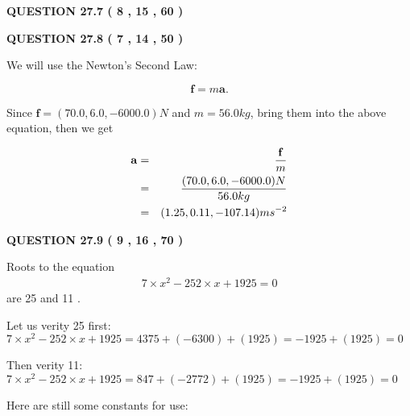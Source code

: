\documentclass[12pt]{article}
\begin{document}
  
  
\vspace{0.2in}
  
{\textbf{\Large{QUESTION
27.7 
 (           8 ,          15 ,          60 )
}}}
  
  
 
 

 
 
  
\vspace{0.2in}
  
{\textbf{\Large{QUESTION
27.8 
 (           7 ,          14 ,          50 )
}}}
  
  
 
 

We will use the Newton's Second Law:
 
\[
\mathbf{f}=m\mathbf{a}.
\]
 
Since $\mathbf{f}= %
(70.0 , 6.0 , -6000.0) N$
and $m= %
56.0kg$, bring them into the above equation, then we get
 
\begin{eqnarray*}
\mathbf{a}&=&\frac{\mathbf{f}}m  \\
&=&\frac{ %
(70.0 , 6.0 , -6000.0) N}{ %
56.0kg}  \\
&=& %
(1.25 , 0.11 , -107.14) ms^{-2}
\end{eqnarray*}
 
 
 
  
\vspace{0.2in}
  
{\textbf{\Large{QUESTION
27.9 
 (           9 ,          16 ,          70 )
}}}
  
  


 
 

Roots to the equation
\begin{eqnarray*}
7 \times x^2  %
-252
                 \times x    %
+  %
1925 =0
\end{eqnarray*}
are  %
25 and  %
11 .
 
Let us verity  %
25 first:
$  %
7 \times x^2  %
-252
                 \times x    %
+  %
1925
  = %
4375+( %
-6300)+( %
1925)
  = %
-1925+( %
1925)
  = %
0
$
 
Then verity  %
11:
$  %
7 \times x^2  %
-252
                 \times x    %
+  %
1925
  = %
847+( %
-2772)+( %
1925)
  = %
-1925+( %
1925)
  = %
0
$
 
 
 
   
   
 \vspace{0.2in}
Here are still some constants for use:
 
\end{document}

